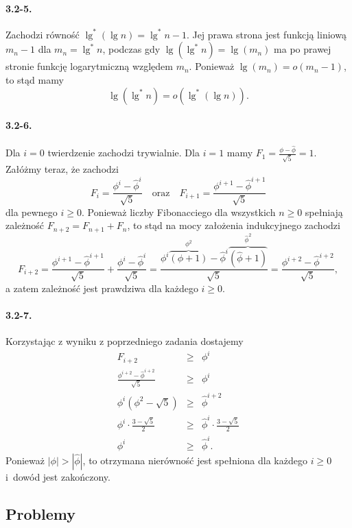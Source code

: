 \paragraph{3.2-5.}
Zachodzi równość $\lg^*(\lg n) = \lg^*n-1$. Jej prawa strona jest funkcją liniową $m_n-1$ dla $m_n = \lg^*n$, podczas gdy $\lg(\lg^*n) = \lg(m_n)$ ma po prawej stronie funkcję logarytmiczną względem $m_n$. Ponieważ $\lg(m_n)=o(m_n-1)$, to stąd mamy
\[
  \lg(\lg^*n) = o(\lg^*(\lg n)).
\]

\paragraph{3.2-6.}
Dla $i=0$ twierdzenie zachodzi trywialnie. Dla $i=1$ mamy $F_1=\frac{\phi-\widehat\phi}{\sqrt{5}}=1$. Załóżmy teraz, że zachodzi
\[
  F_i=\frac{\phi^i-\widehat\phi^i}{\sqrt{5}}\quad\mbox{oraz}\quad F_{i+1}=\frac{\phi^{i+1}-\widehat\phi^{i+1}}{\sqrt{5}}
\]
dla pewnego $i\ge 0$. Ponieważ liczby Fibonacciego dla wszystkich $n\ge 0$ spełniają zależność $F_{n+2}=F_{n+1}+F_n$, to stąd na mocy założenia indukcyjnego zachodzi
\[
  F_{i+2} = \frac{\phi^{i+1}-\widehat\phi^{i+1}}{\sqrt{5}}+\frac{\phi^i-\widehat\phi^i}{\sqrt{5}} = \frac{\phi^i\overbrace{(\phi+1)}^{\phi^2}-\widehat\phi^i\overbrace{\left(\widehat\phi+1\right)}^{\widehat\phi^2}}{\sqrt{5}} = \frac{\phi^{i+2}-\widehat\phi^{i+2}}{\sqrt{5}},
\]
a zatem zależność jest prawdziwa dla każdego $i\ge 0$.

\paragraph{3.2-7.}
Korzystając z wyniku z poprzedniego zadania dostajemy
\begin{eqnarray*}
  F_{i+2} &\ge& \phi^i \\
  \frac{\phi^{i+2}-\widehat\phi^{i+2}}{\sqrt{5}} &\ge& \phi^i \\
  \phi^i\left(\phi^2-\sqrt{5}\right) &\ge& \widehat\phi^{i+2} \\
  \phi^i\cdot\frac{3-\sqrt{5}}{2} &\ge& \widehat\phi^i\cdot\frac{3-\sqrt{5}}{2} \\
  \phi^i &\ge& \widehat\phi^i.
\end{eqnarray*}
Ponieważ $|\phi|>|\widehat\phi|$, to otrzymana nierówność jest spełniona dla każdego $i\ge 0$ i~dowód jest zakończony.

\subsection*{Problemy}

